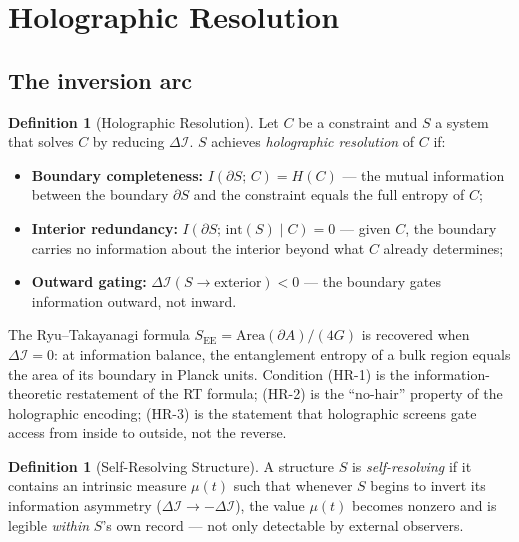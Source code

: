 \documentclass[11pt,a4paper]{article}
\theoremstyle{plain}
\theoremstyle{definition}
\newtheorem{definition}[theorem]{Definition}
\theoremstyle{remark}
\newcommand{\DI}{\Delta\mathcal{I}}
\begin{document}
\section{Holographic Resolution}
\label{sec:holographic}

\subsection{The inversion arc}

\begin{definition}[Holographic Resolution]\label{def:holo}
Let $C$ be a constraint and $S$ a system that solves $C$
by reducing $\DI$.  $S$ achieves \emph{holographic resolution} of $C$ if:
\begin{itemize}[noitemsep]
  \item[(HR-1)] \textbf{Boundary completeness:}
    $I(\partial S;\, C) = H(C)$
    --- the mutual information between the boundary $\partial S$ and
    the constraint equals the full entropy of $C$;
  \item[(HR-2)] \textbf{Interior redundancy:}
    $I(\partial S;\, \mathrm{int}(S) \mid C) = 0$
    --- given $C$, the boundary carries no information about the interior
    beyond what $C$ already determines;
  \item[(HR-3)] \textbf{Outward gating:}
    $\DI(S \to \mathrm{exterior}) < 0$
    --- the boundary gates information outward, not inward.
\end{itemize}
The Ryu--Takayanagi formula $S_{\mathrm{EE}} = \mathrm{Area}(\partial A)/(4G)$
is recovered when $\DI = 0$: at information balance, the entanglement
entropy of a bulk region equals the area of its boundary in Planck units.
Condition (HR-1) is the information-theoretic restatement of the
RT formula; (HR-2) is the ``no-hair'' property of the holographic encoding;
(HR-3) is the statement that holographic screens gate access from
inside to outside, not the reverse.
\end{definition}

\begin{definition}[Self-Resolving Structure]\label{def:self-resolving}
A structure $S$ is \emph{self-resolving} if it contains an intrinsic 
measure $\mu(t)$ such that whenever $S$ begins to invert its information 
asymmetry ($\DI \to -\DI$), the value $\mu(t)$ becomes nonzero and 
is legible \emph{within} $S$'s own record --- not only detectable by 
external observers.
\end{definition}
\end{document}

